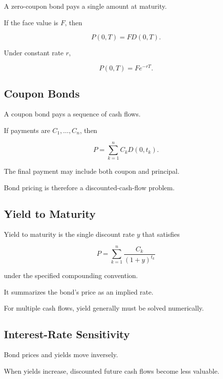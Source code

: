 A zero-coupon bond pays a single amount at maturity.

If the face value is \(F\), then

\[
\boxed{
P(0,T)
=
F D(0,T).
}
\]

Under constant rate \(r\),

\[
\boxed{
P(0,T)
=
Fe^{-rT}.
}
\]

\subsection{Coupon Bonds}
\label{subsec:coupon-bonds}

A coupon bond pays a sequence of cash flows.

If payments are \(C_1,\ldots,C_n\), then

\[
\boxed{
P
=
\sum_{k=1}^{n}
C_kD(0,t_k).
}
\]

The final payment may include both coupon and principal.

Bond pricing is therefore a discounted-cash-flow problem.

\subsection{Yield to Maturity}
\label{subsec:yield-to-maturity}

Yield to maturity is the single discount rate \(y\) that satisfies

\[
\boxed{
P
=
\sum_{k=1}^{n}
\frac{C_k}{(1+y)^{t_k}}
}
\]

under the specified compounding convention.

It summarizes the bond's price as an implied rate.

For multiple cash flows, yield generally must be solved numerically.

\subsection{Interest-Rate Sensitivity}
\label{subsec:interest-rate-sensitivity}

Bond prices and yields move inversely.

When yields increase, discounted future cash flows become less valuable.

